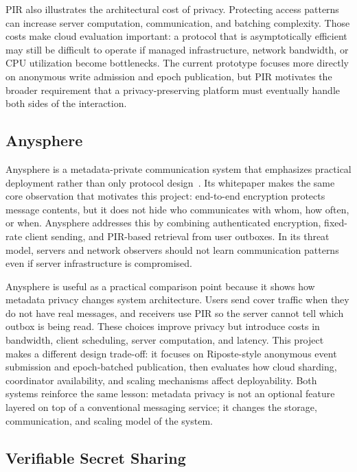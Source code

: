 \documentclass[conference]{IEEEtran}
\begin{document}
PIR also illustrates the architectural cost of privacy. Protecting access patterns can increase server computation, communication, and batching complexity. Those costs make cloud evaluation important: a protocol that is asymptotically efficient may still be difficult to operate if managed infrastructure, network bandwidth, or CPU utilization become bottlenecks. The current prototype focuses more directly on anonymous write admission and epoch publication, but PIR motivates the broader requirement that a privacy-preserving platform must eventually handle both sides of the interaction.

\subsection{Anysphere}

Anysphere is a metadata-private communication system that emphasizes practical deployment rather than only protocol design~\cite{anysphere}. Its whitepaper makes the same core observation that motivates this project: end-to-end encryption protects message contents, but it does not hide who communicates with whom, how often, or when. Anysphere addresses this by combining authenticated encryption, fixed-rate client sending, and PIR-based retrieval from user outboxes. In its threat model, servers and network observers should not learn communication patterns even if server infrastructure is compromised.

Anysphere is useful as a practical comparison point because it shows how metadata privacy changes system architecture. Users send cover traffic when they do not have real messages, and receivers use PIR so the server cannot tell which outbox is being read. These choices improve privacy but introduce costs in bandwidth, client scheduling, server computation, and latency. This project makes a different design trade-off: it focuses on Riposte-style anonymous event submission and epoch-batched publication, then evaluates how cloud sharding, coordinator availability, and scaling mechanisms affect deployability. Both systems reinforce the same lesson: metadata privacy is not an optional feature layered on top of a conventional messaging service; it changes the storage, communication, and scaling model of the system.

\subsection{Verifiable Secret Sharing}
\end{document}
